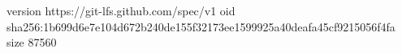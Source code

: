 version https://git-lfs.github.com/spec/v1
oid sha256:1b699d6e7e104d672b240de155f32173ee1599925a40deafa45cf9215056f4fa
size 87560
